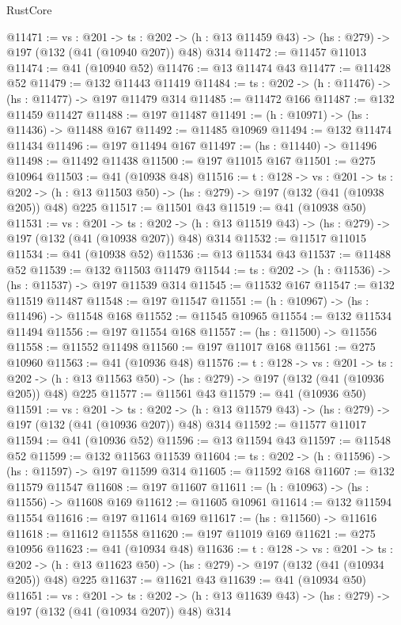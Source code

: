 \begin{lexlean}{RustCore}
\begin{coremodule}
@11471 := {vs : @201} ->
  {ts : @202} -> (h : @13 @11459 @43) -> (hs : @279) -> @197 (@132 (@41 (@10940 @207)) @48) @314
@11472 := @11457 @11013
@11474 := @41 (@10940 @52)
@11476 := @13 @11474 @43
@11477 := @11428 @52
@11479 := @132 @11443 @11419
@11484 := {ts : @202} -> (h : @11476) -> (hs : @11477) -> @197 @11479 @314
@11485 := @11472 @166
@11487 := @132 @11459 @11427
@11488 := @197 @11487
@11491 := (h : @10971) -> (hs : @11436) -> @11488 @167
@11492 := @11485 @10969
@11494 := @132 @11474 @11434
@11496 := @197 @11494 @167
@11497 := (hs : @11440) -> @11496
@11498 := @11492 @11438
@11500 := @197 @11015 @167
@11501 := @275 @10964
@11503 := @41 (@10938 @48)
@11516 := {t : @128} ->
  {vs : @201} ->
  {ts : @202} -> (h : @13 @11503 @50) -> (hs : @279) -> @197 (@132 (@41 (@10938 @205)) @48) @225
@11517 := @11501 @43
@11519 := @41 (@10938 @50)
@11531 := {vs : @201} ->
  {ts : @202} -> (h : @13 @11519 @43) -> (hs : @279) -> @197 (@132 (@41 (@10938 @207)) @48) @314
@11532 := @11517 @11015
@11534 := @41 (@10938 @52)
@11536 := @13 @11534 @43
@11537 := @11488 @52
@11539 := @132 @11503 @11479
@11544 := {ts : @202} -> (h : @11536) -> (hs : @11537) -> @197 @11539 @314
@11545 := @11532 @167
@11547 := @132 @11519 @11487
@11548 := @197 @11547
@11551 := (h : @10967) -> (hs : @11496) -> @11548 @168
@11552 := @11545 @10965
@11554 := @132 @11534 @11494
@11556 := @197 @11554 @168
@11557 := (hs : @11500) -> @11556
@11558 := @11552 @11498
@11560 := @197 @11017 @168
@11561 := @275 @10960
@11563 := @41 (@10936 @48)
@11576 := {t : @128} ->
  {vs : @201} ->
  {ts : @202} -> (h : @13 @11563 @50) -> (hs : @279) -> @197 (@132 (@41 (@10936 @205)) @48) @225
@11577 := @11561 @43
@11579 := @41 (@10936 @50)
@11591 := {vs : @201} ->
  {ts : @202} -> (h : @13 @11579 @43) -> (hs : @279) -> @197 (@132 (@41 (@10936 @207)) @48) @314
@11592 := @11577 @11017
@11594 := @41 (@10936 @52)
@11596 := @13 @11594 @43
@11597 := @11548 @52
@11599 := @132 @11563 @11539
@11604 := {ts : @202} -> (h : @11596) -> (hs : @11597) -> @197 @11599 @314
@11605 := @11592 @168
@11607 := @132 @11579 @11547
@11608 := @197 @11607
@11611 := (h : @10963) -> (hs : @11556) -> @11608 @169
@11612 := @11605 @10961
@11614 := @132 @11594 @11554
@11616 := @197 @11614 @169
@11617 := (hs : @11560) -> @11616
@11618 := @11612 @11558
@11620 := @197 @11019 @169
@11621 := @275 @10956
@11623 := @41 (@10934 @48)
@11636 := {t : @128} ->
  {vs : @201} ->
  {ts : @202} -> (h : @13 @11623 @50) -> (hs : @279) -> @197 (@132 (@41 (@10934 @205)) @48) @225
@11637 := @11621 @43
@11639 := @41 (@10934 @50)
@11651 := {vs : @201} ->
  {ts : @202} -> (h : @13 @11639 @43) -> (hs : @279) -> @197 (@132 (@41 (@10934 @207)) @48) @314

\end{coremodule}
\end{lexlean}
